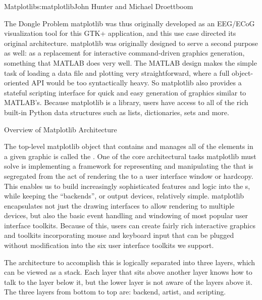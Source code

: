 \begin{aosachapter}{Matplotlib}{s:matplotlib}{John Hunter and Michael Droettboom}
\begin{aosasect1}{The Dongle Problem}
matplotlib was thus originally developed as an EEG/ECoG visualization
tool for this GTK+ application, and this use case directed its
original architecture.  matplotlib was originally designed to serve a
second purpose as well: as a replacement for interactive command-driven 
graphics generation, something that MATLAB does very well.  The
MATLAB design makes the simple task of loading a data file and
plotting very straightforward, where a full object-oriented API would
be too syntactically heavy.  So matplotlib also provides a stateful
scripting interface for quick and easy generation of graphics similar
to MATLAB's.  Because matplotlib is a library, users have access to
all of the rich built-in Python data structures such as lists,
dictionaries, sets and more.


\end{aosasect1}

\begin{aosasect1}{Overview of Matplotlib Architecture}

The top-level matplotlib object that contains and manages all of the
elements in a given graphic is called the .  One of the
core architectural tasks matplotlib must solve is implementing a
framework for representing and manipulating the  that
is segregated from the act of rendering the  to a user
interface window or hardcopy.  This enables us to build increasingly
sophisticated features and logic into the s, while
keeping the ``backends'', or output devices, relatively simple.
matplotlib encapsulates not just the drawing interfaces to allow
rendering to multiple devices, but also the basic event
handling and windowing of most popular user interface toolkits.
Because of this, users can create fairly rich interactive graphics
and toolkits incorporating mouse and keyboard input that can be
plugged without modification into the six user interface toolkits we support.

The architecture to accomplish this is logically separated into three
layers, which can be viewed as a stack.  Each layer that sits above
another layer knows how to talk to the layer below it, but the lower
layer is not aware of the layers above it.  The three layers from
bottom to top are: backend, artist, and scripting.



\end{aosasect1}
\end{aosachapter}
